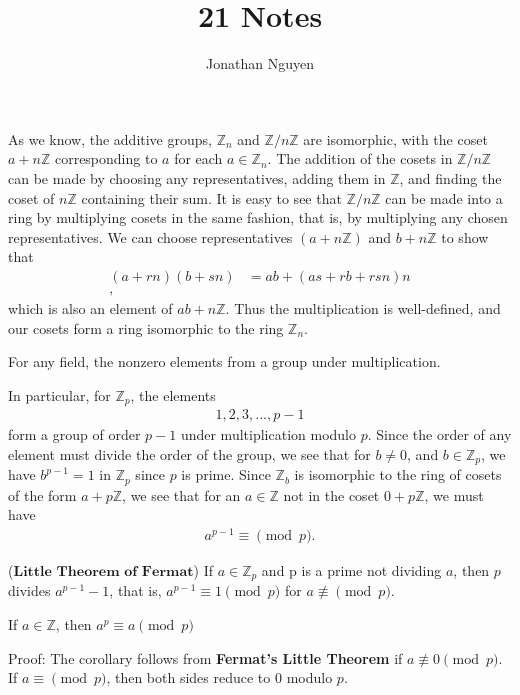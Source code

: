 \documentclass[11pt]{article}
\title{21 Notes}
\author{Jonathan Nguyen}
\date{}
\begin{document}
\maketitle

As we know, the additive groups, $\mathbb{Z}_n$ and $\mathbb{Z}/n\mathbb{Z}$ are isomorphic, with the coset $a + n\mathbb{Z}$ corresponding to $a$ for each $a \in \mathbb{Z}_n$. 
The addition of the cosets in $\mathbb{Z}/n\mathbb{Z}$ can be made by choosing any representatives, adding them in $\mathbb{Z}$, and finding the coset of $n\mathbb{Z}$ containing their sum. 
It is easy to see that $\mathbb{Z}/n\mathbb{Z}$ can be made into a ring by multiplying cosets in the same fashion, that is, by multiplying any chosen representatives. 
We can choose representatives $(a+n\mathbb{Z})$ and $b+n\mathbb{Z}$ to show that
\begin{align*}
    (a+rn)(b+sn) &= ab+(as+rb+rsn)n\\,
\end{align*}
which is also an element of $ab+n\mathbb{Z}$. Thus the multiplication is well-defined, and our cosets form a ring isomorphic to the ring $\mathbb{Z}_n$.

\begin{theorem}
    For any field, the nonzero elements from a group under multiplication.
\end{theorem}
In particular, for $\mathbb{Z}_p$, the elements 
\begin{align*}
    1,2,3,...,p-1
\end{align*}
form a group of order $p-1$ under multiplication modulo $p$. Since the order of any element must divide the order of the group, we see that for $b \neq 0$, and $b \in \mathbb{Z}_p$, we have 
$b^{p-1}=1$ in $\mathbb{Z}_p$ since $p$ is prime. Since $\mathbb{Z}_b$ is isomorphic to the ring of cosets of the form $a + p\mathbb{Z}$, we see that for an $a \in \mathbb{Z}$ 
not in the coset $0 + p\mathbb{Z}$, we must have 
\begin{align*}
    a^{p-1} \equiv \pmod{p}.
\end{align*}

\begin{theorem}
    ($\textbf{Little Theorem of Fermat}$) If $a \in \mathbb{Z}_p$ and p is a prime not dividing $a$, then $p$ divides $a^{p-1} - 1$, that is, $a^{p-1}\equiv 1 \pmod{p}$ for $a \not\equiv \pmod{p}$.
\end{theorem}

\begin{corollary}
    If $a \in \mathbb{Z}$, then $a^p \equiv a \pmod{p}$
\end{corollary}
Proof:
The corollary follows from \textbf{Fermat's Little Theorem} if $a \not\equiv 0 \pmod{p}$. If $a \equiv \pmod{p}$, then both sides reduce to 0 modulo $p$.
\end{document}
